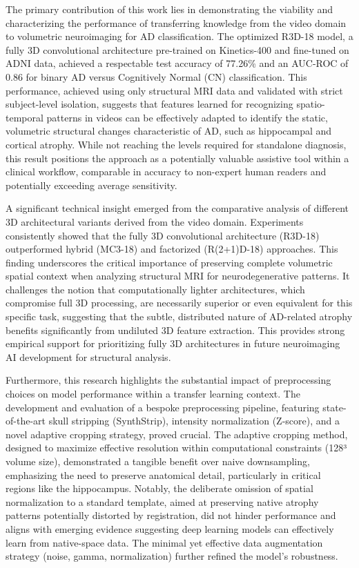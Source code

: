 \documentclass[11pt, a4paper]{article}
\begin{document}
The primary contribution of this work lies in demonstrating the viability and characterizing the performance of transferring knowledge from the video domain to volumetric neuroimaging for AD classification. The optimized R3D-18 model, a fully 3D convolutional architecture pre-trained on Kinetics-400 and fine-tuned on ADNI data, achieved a respectable test accuracy of 77.26\% and an AUC-ROC of 0.86 for binary AD versus Cognitively Normal (CN) classification. This performance, achieved using only structural MRI data and validated with strict subject-level isolation, suggests that features learned for recognizing spatio-temporal patterns in videos can be effectively adapted to identify the static, volumetric structural changes characteristic of AD, such as hippocampal and cortical atrophy. While not reaching the levels required for standalone diagnosis, this result positions the approach as a potentially valuable assistive tool within a clinical workflow, comparable in accuracy to non-expert human readers and potentially exceeding average sensitivity.

A significant technical insight emerged from the comparative analysis of different 3D architectural variants derived from the video domain. Experiments consistently showed that the fully 3D convolutional architecture (R3D-18) outperformed hybrid (MC3-18) and factorized (R(2+1)D-18) approaches. This finding underscores the critical importance of preserving complete volumetric spatial context when analyzing structural MRI for neurodegenerative patterns. It challenges the notion that computationally lighter architectures, which compromise full 3D processing, are necessarily superior or even equivalent for this specific task, suggesting that the subtle, distributed nature of AD-related atrophy benefits significantly from undiluted 3D feature extraction. This provides strong empirical support for prioritizing fully 3D architectures in future neuroimaging AI development for structural analysis.

Furthermore, this research highlights the substantial impact of preprocessing choices on model performance within a transfer learning context. The development and evaluation of a bespoke preprocessing pipeline, featuring state-of-the-art skull stripping (SynthStrip), intensity normalization (Z-score), and a novel adaptive cropping strategy, proved crucial. The adaptive cropping method, designed to maximize effective resolution within computational constraints (128³ volume size), demonstrated a tangible benefit over naive downsampling, emphasizing the need to preserve anatomical detail, particularly in critical regions like the hippocampus. Notably, the deliberate omission of spatial normalization to a standard template, aimed at preserving native atrophy patterns potentially distorted by registration, did not hinder performance and aligns with emerging evidence suggesting deep learning models can effectively learn from native-space data. The minimal yet effective data augmentation strategy (noise, gamma, normalization) further refined the model's robustness.
\end{document}
